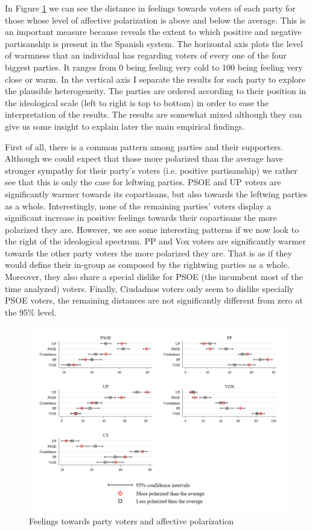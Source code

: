 \documentclass[a4paper, svgnames]{article}
\begin{document}
In Figure \ref*{fig:feelings} we can see the distance in feelings towards voters of each party for those whose level of affective polarization is above and below the average. This is an important measure because reveals the extent to which positive and negative partisanship is present in the Spanish system. The horizontal axis plots the level of warmness that an individual has regarding voters of every one of the four biggest parties. It ranges from 0 being feeling very cold to 100 being feeling very close or warm. In the vertical axis I separate the results for each party to explore the plausible heterogeneity. The parties are ordered according to their position in the ideological scale (left to right is top to bottom) in order to ease the interpretation of the results. The results are somewhat mixed although they can give us some insight to explain later the main empirical findings.

First of all, there is a common pattern among parties and their supporters. Although we could expect that those more polarized than the average have stronger sympathy for their party's voters (i.e. positive partisanship) we rather see that this is only the case for leftwing parties. PSOE and UP voters are significantly warmer towards its copartisans, but also towards the leftwing parties as a whole. Interestingly, none of the remaining parties' voters display a significant increase in positive feelings towards their copartisans the more polarized they are. However, we see some interesting patterns if we now look to the right of the ideological spectrum. PP and Vox voters are significantly warmer towards the other party voters the more polarized they are. That is as if they would define their in-group as composed by the rightwing parties as a whole. Moreover, they also share a special dislike for PSOE (the incumbent most of the time analyzed) voters. Finally, Ciudadnos voters only seem to dislike specially PSOE voters, the remaining distances are not significantly different from zero at the 95\% level.

\begin{figure}[H]
	\centering
	\includegraphics[scale=0.35]{Figures/combinedfeelingsAP.png}
	\caption{\label{fig:feelings} Feelings towards party voters and affective polarization}
\end{figure}
\end{document}
